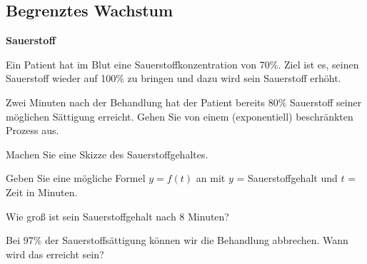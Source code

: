
\subsection{Begrenztes Wachstum}


\bbwActAufgabenNr{} \textbf{Sauerstoff}

Ein Patient hat im Blut eine Sauerstoffkonzentration von 70\%. Ziel
ist es, seinen Sauerstoff wieder auf 100\% zu bringen und dazu wird
sein Sauerstoff erhöht.

Zwei Minuten nach der Behandlung hat der Patient bereits 80\%
Sauerstoff seiner möglichen Sättigung erreicht. Gehen Sie von einem
(exponentiell) beschränkten Prozess aus.

\begin{bbwAufgabenBlock}


\item Machen Sie eine Skizze des Sauerstoffgehaltes.

  
\item Geben Sie eine mögliche Formel $y = f(t)$ an mit $y$ = Sauerstoffgehalt und
$t$ = Zeit in Minuten.

  
\item Wie groß ist sein Sauerstoffgehalt nach 8 Minuten?

  
\item
  Bei 97\% der Sauerstoffsättigung können wir die Behandlung
abbrechen. Wann wird das erreicht sein?


\end{bbwAufgabenBlock}


\platzFuerBerechnungenBisEndeSeite{}



